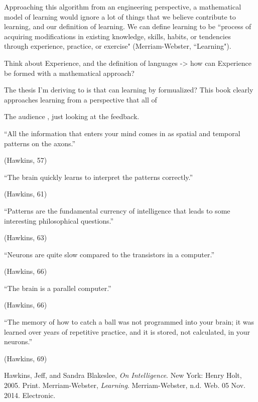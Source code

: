 \documentclass[11pt, oneside]{article}
\begin{document}
\par Approaching this algorithm from an engineering perspective, a mathematical model of learning would ignore a lot of things that we believe contribute to learning, and our definition of learning. We can define learning to be ``process of acquiring modifications in existing knowledge, skills, habits, or tendencies through experience, practice, or exercise" (Merriam-Webster, ``Learning"). 

\par Think about Experience, and the definition of languages -> how can Experience be formed with a mathematical approach?

\par The thesis I'm deriving to is that can learning by formualized? This book clearly approaches learning from a perspective that all of 

\par The audience , just looking at the feedback.

\epigraph{``All the information that enters your mind comes in as spatial and temporal patterns on the axons.''}{(Hawkins, 57)} 

\epigraph{``The brain quickly learns to interpret the patterns correctly.''}{(Hawkins, 61)} 

\epigraph{``Patterns are the fundamental currency of intelligence that leads to some interesting philosophical questions.''}{(Hawkins, 63)} 

\epigraph{``Neurons are quite slow compared to the transistors in a computer.''}{(Hawkins, 66)} 

\epigraph{``The brain is a parallel computer.''}{(Hawkins, 66)} 

\epigraph{``The memory of how to catch a ball was not programmed into your brain; it was learned over years of repetitive practice, and it is stored, not calculated, in your neurons.''}{(Hawkins, 69)} 


\begin{thebibliography}{9}
  Hawkins, Jeff, and Sandra Blakeslee,
  \emph{On Intelligence}.
  New York: Henry Holt, 2005.
  Print.
  Merriam-Webster,
  \emph{Learning}.
  Merriam-Webster, n.d. Web. 05 Nov. 2014.
  Electronic.
\end{thebibliography}
\end{document}
